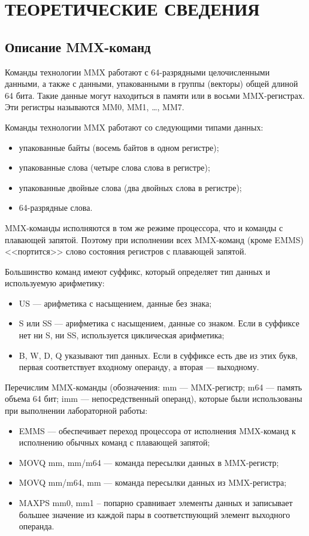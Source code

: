 \section{ТЕОРЕТИЧЕСКИЕ СВЕДЕНИЯ}

\subsection{Описание MMX-команд}

Команды технологии MMX работают с 64-разрядными целочисленными данными,
а также с данными, упакованными в группы (векторы) общей длиной 64 бита.
Такие данные могут находиться в памяти или в восьми MMX-регистрах. 
Эти регистры называются MM0, MM1, \dots , MM7.

Команды технологии MMX работают со следующими типами данных:
\begin{itemize}
\item упакованные байты (восемь байтов в одном регистре);
\item упакованные слова (четыре слова слова в регистре);
\item упакованные двойные слова (два двойных слова в регистре);
\item 64-разрядные слова.
\end{itemize}

MMX-команды исполняются в том же режиме процессора, 
что и команды с плавающей запятой.
Поэтому при исполнении всех MMX-команд (кроме EMMS) <<портится>>
слово состояния регистров с плавающей запятой.

Большинство команд имеют суффикс, который определяет тип данных 
и используемую арифметику:
\begin{itemize}
\item US --- арифметика с насыщением, 
  данные без знака;
\item S или SS --- арифметика с насыщением, данные со знаком.
  Если в суффиксе нет ни S, ни SS, используется циклическая арифметика;
\item B, W, D, Q указывают тип данных.
  Если в суффиксе есть две из этих букв, 
  первая соответствует входному операнду, а вторая --- выходному.
\end{itemize}

Перечислим MMX-команды
(обозначения: mm --- MMX-регистр;
m64 --- память объема 64 бит; 
imm --- непосредственный операнд), 
которые были использованы при выполнении лабораторной работы:
\begin{itemize}
\item EMMS --- 
  обеспечивает переход процессора от исполнения MMX-команд к
  исполнению обычных команд с плавающей запятой;

\item MOVQ mm, mm/m64 ---
  команда пересылки данных в MMX-регистр;

\item MOVQ mm/m64, mm ---
  команда пересылки данных из MMX-регистра;

\item MAXPS mm0, mm1 --
  попарно сравнивает элементы данных и записывает большее значение из
  каждой пары в соответствующий элемент выходного операнда.
\end{itemize}
